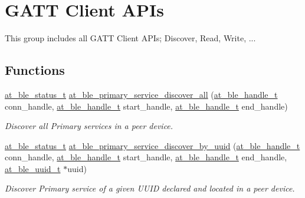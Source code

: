 \hypertarget{group__gatt__client__group}{}\section{G\+A\+TT Client A\+P\+Is}
\label{group__gatt__client__group}


This group includes all G\+A\+TT Client A\+P\+Is; Discover, Read, Write, ...  


\subsection*{Functions}
\begin{DoxyCompactItemize}
\item 
\mbox{\hyperlink{group__error__codes__group_ga3b1db9b95feb157b3c188ca27fe76988}{at\+\_\+ble\+\_\+status\+\_\+t}} \mbox{\hyperlink{group__gatt__client__group_ga5bf7a23fc6f8b6fbc30de8ca5ed7d159}{at\+\_\+ble\+\_\+primary\+\_\+service\+\_\+discover\+\_\+all}} (\mbox{\hyperlink{at__ble__api_8h_abd23646d0c662860741f787efc8456f2}{at\+\_\+ble\+\_\+handle\+\_\+t}} conn\+\_\+handle, \mbox{\hyperlink{at__ble__api_8h_abd23646d0c662860741f787efc8456f2}{at\+\_\+ble\+\_\+handle\+\_\+t}} start\+\_\+handle, \mbox{\hyperlink{at__ble__api_8h_abd23646d0c662860741f787efc8456f2}{at\+\_\+ble\+\_\+handle\+\_\+t}} end\+\_\+handle)
\begin{DoxyCompactList}\small\item\em Discover all Primary services in a peer device. \end{DoxyCompactList}\item 
\mbox{\hyperlink{group__error__codes__group_ga3b1db9b95feb157b3c188ca27fe76988}{at\+\_\+ble\+\_\+status\+\_\+t}} \mbox{\hyperlink{group__gatt__client__group_gadf352205d818cf47fc659824232bed9a}{at\+\_\+ble\+\_\+primary\+\_\+service\+\_\+discover\+\_\+by\+\_\+uuid}} (\mbox{\hyperlink{at__ble__api_8h_abd23646d0c662860741f787efc8456f2}{at\+\_\+ble\+\_\+handle\+\_\+t}} conn\+\_\+handle, \mbox{\hyperlink{at__ble__api_8h_abd23646d0c662860741f787efc8456f2}{at\+\_\+ble\+\_\+handle\+\_\+t}} start\+\_\+handle, \mbox{\hyperlink{at__ble__api_8h_abd23646d0c662860741f787efc8456f2}{at\+\_\+ble\+\_\+handle\+\_\+t}} end\+\_\+handle, \mbox{\hyperlink{structat__ble__uuid__t}{at\+\_\+ble\+\_\+uuid\+\_\+t}} $\ast$uuid)
\begin{DoxyCompactList}\small\item\em Discover Primary service of a given U\+U\+ID declared and located in a peer device. \end{DoxyCompactList}\item 

\end{DoxyCompactItemize}
